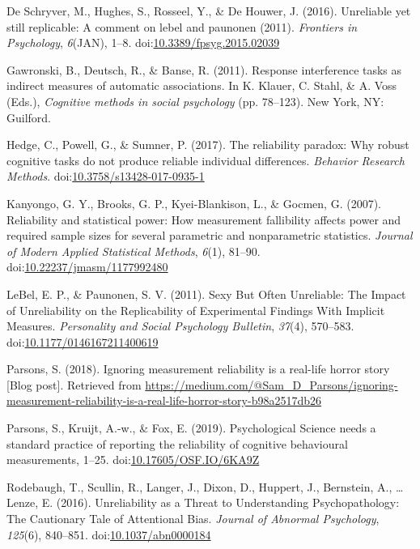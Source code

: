 \documentclass[english,,man]{apa6}
\begin{document}
\leavevmode\hypertarget{ref-DeSchryver2016}{}%
De Schryver, M., Hughes, S., Rosseel, Y., \& De Houwer, J. (2016). Unreliable yet still replicable: A comment on lebel and paunonen (2011). \emph{Frontiers in Psychology}, \emph{6}(JAN), 1--8. doi:\href{https://doi.org/10.3389/fpsyg.2015.02039}{10.3389/fpsyg.2015.02039}

\leavevmode\hypertarget{ref-Gawronski2011}{}%
Gawronski, B., Deutsch, R., \& Banse, R. (2011). Response interference tasks as indirect measures of automatic associations. In K. Klauer, C. Stahl, \& A. Voss (Eds.), \emph{Cognitive methods in social psychology} (pp. 78--123). New York, NY: Guilford.

\leavevmode\hypertarget{ref-Hedge2017}{}%
Hedge, C., Powell, G., \& Sumner, P. (2017). The reliability paradox: Why robust cognitive tasks do not produce reliable individual differences. \emph{Behavior Research Methods}. doi:\href{https://doi.org/10.3758/s13428-017-0935-1}{10.3758/s13428-017-0935-1}

\leavevmode\hypertarget{ref-Kanyongo2007}{}%
Kanyongo, G. Y., Brooks, G. P., Kyei-Blankison, L., \& Gocmen, G. (2007). Reliability and statistical power: How measurement fallibility affects power and required sample sizes for several parametric and nonparametric statistics. \emph{Journal of Modern Applied Statistical Methods}, \emph{6}(1), 81--90. doi:\href{https://doi.org/10.22237/jmasm/1177992480}{10.22237/jmasm/1177992480}

\leavevmode\hypertarget{ref-LeBel2011}{}%
LeBel, E. P., \& Paunonen, S. V. (2011). Sexy But Often Unreliable: The Impact of Unreliability on the Replicability of Experimental Findings With Implicit Measures. \emph{Personality and Social Psychology Bulletin}, \emph{37}(4), 570--583. doi:\href{https://doi.org/10.1177/0146167211400619}{10.1177/0146167211400619}

\leavevmode\hypertarget{ref-Parsons2018}{}%
Parsons, S. (2018). Ignoring measurement reliability is a real-life horror story {[}Blog post{]}. Retrieved from \url{https://medium.com/@Sam_D_Parsons/ignoring-measurement-reliability-is-a-real-life-horror-story-b98a2517db26}

\leavevmode\hypertarget{ref-Parsons2018a}{}%
Parsons, S., Kruijt, A.-w., \& Fox, E. (2019). Psychological Science needs a standard practice of reporting the reliability of cognitive behavioural measurements, 1--25. doi:\href{https://doi.org/10.17605/OSF.IO/6KA9Z}{10.17605/OSF.IO/6KA9Z}

\leavevmode\hypertarget{ref-Rodebaugh2016}{}%
Rodebaugh, T., Scullin, R., Langer, J., Dixon, D., Huppert, J., Bernstein, A., \ldots{} Lenze, E. (2016). Unreliability as a Threat to Understanding Psychopathology: The Cautionary Tale of Attentional Bias. \emph{Journal of Abnormal Psychology}, \emph{125}(6), 840--851. doi:\href{https://doi.org/10.1037/abn0000184}{10.1037/abn0000184}
\end{document}

